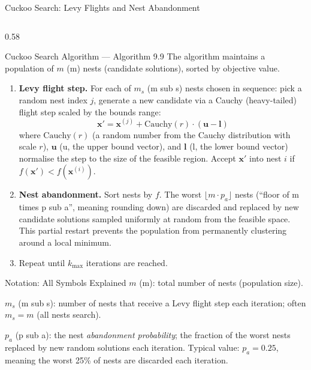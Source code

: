 \documentclass[aspectratio=169,10pt]{beamer}
\newcommand{\bx}{\mathbf{x}}
\begin{document}
\begin{frame}[allowframebreaks]{Cuckoo Search: Levy Flights and Nest Abandonment}
  \begin{columns}[T]
    \begin{column}{0.58\textwidth}
      \begin{block}{Cuckoo Search Algorithm --- Algorithm 9.9}
        The algorithm maintains a population of $m$ (m) nests
        (candidate solutions), sorted by objective value.
        \begin{enumerate}
          \item \textbf{Levy flight step.} For each of $m_s$ (m sub s)
                nests chosen in sequence: pick a random nest index $j$,
                generate a new candidate via a Cauchy (heavy-tailed)
                flight step scaled by the bounds range:
                \[
                  \bx' = \bx^{(j)} + \text{Cauchy}(r) \cdot (\mathbf{u} - \mathbf{l})
                \]
                where $\text{Cauchy}(r)$ (a random number from the
                Cauchy distribution with scale $r$), $\mathbf{u}$
                (u, the upper bound vector), and $\mathbf{l}$
                (l, the lower bound vector) normalise the step to
                the size of the feasible region.  Accept $\bx'$
                into nest $i$ if $f(\bx') < f(\bx^{(i)})$.
          \item \textbf{Nest abandonment.} Sort nests by $f$.
                The worst $\lfloor m \cdot p_a \rfloor$ nests
                (``floor of m times p sub a'', meaning rounding down)
                are discarded and replaced by new candidate solutions
                sampled uniformly at random from the feasible space.
                This partial restart prevents the population from
                permanently clustering around a local minimum.
          \item Repeat until $k_{\max}$ iterations are reached.
        \end{enumerate}
      \end{block}

      \begin{block}{Notation: All Symbols Explained}
        $m$ (m): total number of nests (population size).

        $m_s$ (m sub s): number of nests that receive a Levy flight
        step each iteration; often $m_s = m$ (all nests search).

        $p_a$ (p sub a): the nest \emph{abandonment probability};
        the fraction of the worst nests replaced by new random
        solutions each iteration.  Typical value: $p_a = 0.25$,
        meaning the worst 25\% of nests are discarded each iteration.


\end{block}
\end{column}
\end{columns}
\end{frame}
\end{document}
